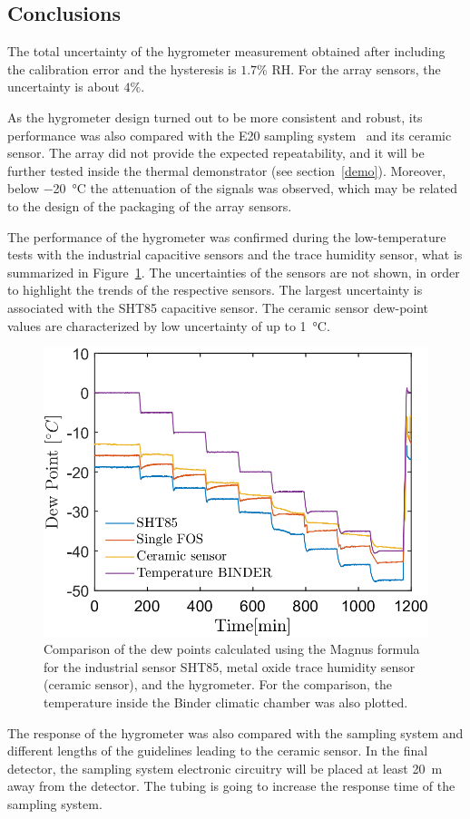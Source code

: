 \subsection{Conclusions}
The total uncertainty of the hygrometer measurement obtained after including the calibration error and the hysteresis is $1.7$\% RH. For the array sensors, the uncertainty is about $4\%$.


As the hygrometer design turned out to be more consistent and robust, its performance was also compared with the E20 sampling system~\cite{michell_e20} and its ceramic sensor. The array did not provide the expected repeatability, and it  will be further tested inside the thermal demonstrator (see section~\ref{demo}). Moreover, below \SI{-20}{\celsius} the attenuation of the signals was observed, which may be related to the design of the packaging of the array sensors.

The performance of the hygrometer was confirmed during the low-temperature tests with the industrial capacitive sensors and the trace humidity sensor, what is summarized in Figure~\ref{fig_comparison}. The uncertainties of the sensors are not shown, in order to highlight the trends of the respective sensors. The largest uncertainty is associated with the SHT85 capacitive sensor. The ceramic sensor dew-point values are characterized by low uncertainty of up to \SI{1}{\celsius}.  
\begin{figure}[!h]
\centering
\includegraphics[width=0.6\columnwidth]{Chapter5/images/DPCPercent.png}
\caption{Comparison of the dew points calculated using the Magnus formula for the industrial sensor SHT85, metal oxide trace humidity sensor (ceramic sensor), and the hygrometer. For the comparison, the temperature inside the Binder climatic chamber was also plotted.}
\label{fig_comparison}
\end{figure}

The response of the hygrometer was also compared with the sampling system and different lengths of the guidelines leading to the ceramic sensor. In the final detector, the sampling system electronic circuitry will be placed at least \SI{20}{\metre} away from the detector. The tubing is going to increase the response time of the sampling system. 

